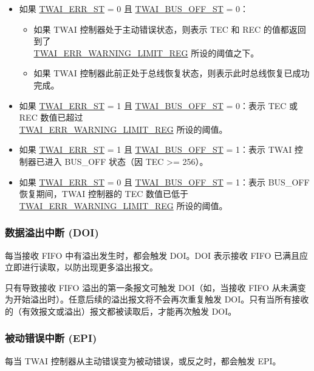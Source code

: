 \documentclass[main\_\_CN.tex]{subfiles}
\begin{document}
\begin{itemize}
    \item 如果 \hyperref[fielddesc:TWAIERRST]{TWAI\_ERR\_ST} = 0 且 \hyperref[fielddesc:TWAIBUSOFFST]{TWAI\_BUS\_OFF\_ST} = 0：
    \begin{itemize}
        \item 如果 TWAI 控制器处于主动错误状态，则表示 TEC 和 REC 的值都返回到了 \\\hyperref[regdesc:TWAIERRWARNINGLIMITREG]{TWAI\_ERR\_WARNING\_LIMIT\_REG} 所设的阈值之下。
        \item 如果 TWAI 控制器此前正处于总线恢复状态，则表示此时总线恢复已成功完成。
    \end{itemize}
    \item 如果 \hyperref[fielddesc:TWAIERRST]{TWAI\_ERR\_ST} = 1 且 \hyperref[fielddesc:TWAIBUSOFFST]{TWAI\_BUS\_OFF\_ST} = 0：表示 TEC 或 REC 数值已超过 \\\hyperref[regdesc:TWAIERRWARNINGLIMITREG]{TWAI\_ERR\_WARNING\_LIMIT\_REG} 所设的阈值。
    \item 如果 \hyperref[fielddesc:TWAIERRST]{TWAI\_ERR\_ST} = 1 且 \hyperref[fielddesc:TWAIBUSOFFST]{TWAI\_BUS\_OFF\_ST} = 1：表示 TWAI 控制器已进入 BUS\_OFF 状态（因 TEC >= 256）。
    \item 如果 \hyperref[fielddesc:TWAIERRST]{TWAI\_ERR\_ST} = 0 且 \hyperref[fielddesc:TWAIBUSOFFST]{TWAI\_BUS\_OFF\_ST} = 1：表示 BUS\_OFF 恢复期间，TWAI 控制器的 TEC 数值已低于 \hyperref[regdesc:TWAIERRWARNINGLIMITREG]{TWAI\_ERR\_WARNING\_LIMIT\_REG} 所设的阈值。
\end{itemize}

\subsubsection{数据溢出中断 (DOI)}
\label{other:twai-para-doi}
每当接收 FIFO 中有溢出发生时，都会触发 DOI。DOI 表示接收 FIFO 已满且应立即进行读取，以防出现更多溢出报文。

只有导致接收 FIFO 溢出的第一条报文可触发 DOI（如，当接收 FIFO 从未满变为开始溢出时）。任意后续的溢出报文将不会再次重复触发 DOI。只有当所有接收的（有效报文或溢出）报文都被读取后，才能再次触发 DOI。

\subsubsection{被动错误中断 (EPI)}
\label{other:twai-para-epi}
每当 TWAI 控制器从主动错误变为被动错误，或反之时，都会触发 EPI。
\end{document}
